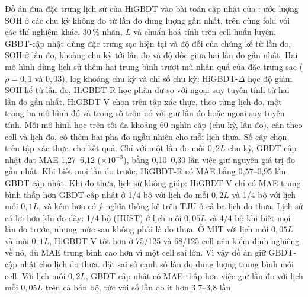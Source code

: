 \label{sec:anchor}Đồ án đưa đặc trưng lịch sử của HiGBDT vào bài toán cập nhật của : ước lượng SOH ở các chu kỳ không đo từ lần đo dung lượng gần nhất, trên cùng fold với các thí nghiệm khác, 30\,\% nhãn, $L$ và chuẩn hoá tính trên cell huấn luyện. GBDT-cập nhật dùng đặc trưng sạc hiện tại và độ đổi của chúng kể từ lần đo, SOH ở lần đo, khoảng chu kỳ tới lần đo và độ dốc giữa hai lần đo gần nhất. Hai mô hình dùng lịch sử thêm hai trung bình trượt mũ nhân quả của đặc trưng sạc ($\rho = 0{,}1$ và $0{,}03$), log khoảng chu kỳ và chỉ số chu kỳ: HiGBDT-$\Delta$ học độ giảm SOH kể từ lần đo, HiGBDT-R học phần dư so với ngoại suy tuyến tính từ hai lần đo gần nhất. HiGBDT-V chọn trên tập xác thực, theo từng lịch đo, một trong ba mô hình đó và trọng số trộn nó với giữ lần đo hoặc ngoại suy tuyến tính. Mỗi mô hình học trên tối đa khoảng 60 nghìn cặp (chu kỳ, lần đo), cân theo cell và lịch đo, có thêm hai pha đo ngẫu nhiên cho mỗi lịch thưa. Số cây chọn trên tập xác thực.  cho kết quả. Chỉ với một lần đo mỗi $0{,}2L$ chu kỳ, GBDT-cập nhật đạt MAE 1{,}27--6{,}12 ($\times10^{-3}$), bằng 0{,}10--0{,}30 lần việc giữ nguyên giá trị đo gần nhất. Khi biết mọi lần đo trước, HiGBDT-R có MAE bằng 0{,}57--0{,}95 lần GBDT-cập nhật. Khi đo thưa, lịch sử không giúp: HiGBDT-V chỉ có MAE trung bình thấp hơn GBDT-cập nhật ở 1/4 bộ với lịch đo mỗi $0{,}2L$ và 1/4 bộ với lịch mỗi $0{,}1L$, và kém hơn có ý nghĩa thống kê trên TJU ở cả ba lịch đo thưa. Lịch sử có lợi hơn khi đo dày: 1/4 bộ (HUST) ở lịch mỗi $0{,}05L$ và 4/4 bộ khi biết mọi lần đo trước, nhưng mức sau không phải là đo thưa. Ở MIT với lịch mỗi $0{,}05L$ và mỗi $0{,}1L$, HiGBDT-V tốt hơn ở 75/125 và 68/125 cell nên kiểm định nghiêng về nó, dù MAE trung bình cao hơn vì một cell sai lớn. Vì vậy đồ án giữ GBDT-cập nhật cho lịch đo thưa.  đặt sai số cạnh số lần đo dung lượng trung bình mỗi cell. Với lịch mỗi $0{,}2L$, GBDT-cập nhật có MAE thấp hơn việc giữ lần đo với lịch mỗi $0{,}05L$ trên cả bốn bộ, tức với số lần đo ít hơn 3{,}7--3{,}8 lần.

